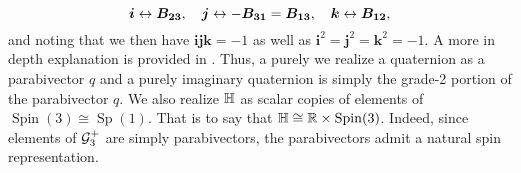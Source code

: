 \begin{equation}
\boldsymbol{i} \leftrightarrow \boldsymbol{B_{23}}, \quad \boldsymbol{j} \leftrightarrow -\boldsymbol{B_{31}}=\boldsymbol{B_{13}}, \quad \boldsymbol{k} \leftrightarrow \boldsymbol{B_{12}},
\end{equation}
and noting that we then have $\boldsymbol{ijk}=-1$ as well as $\boldsymbol{i}^2=\boldsymbol{j}^2=\boldsymbol{k}^2=-1$. A more in depth explanation is provided in \cite{doran_geometric_2003}. Thus, a purely we realize a quaternion as a parabivector $q$ and a purely imaginary quaternion is simply the grade-2 portion of the parabivector $q$. We also realize $\mathbb{H}$ as scalar copies of elements of $\operatorname{Spin}(3) \cong \operatorname{Sp}(1)$. That is to say that $\mathbb{H} \cong \mathbb{R} \times \operatorname{Spin}(3)$. Indeed, since elements of $\mathcal{G}_3^+$ are simply parabivectors, the parabivectors admit a natural spin representation.

